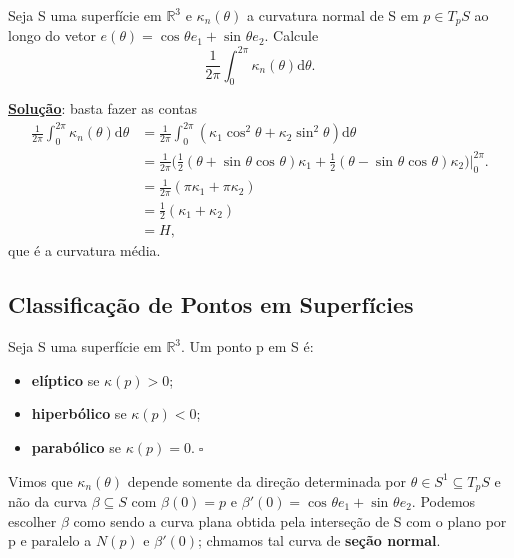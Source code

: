 \documentclass[../differential_geometry.tex]{subfiles}
\begin{document}
\begin{exr}
	Seja S uma superfície em \(\mathbb{R}^{3}\) e \(\kappa_{n}(\theta )\) a curvatura normal de S em \(p\in T_pS\) ao longo do vetor \(e(\theta ) = \cos^{}{\theta }e_1+\sin^{}{\theta }e_2\). Calcule
	\[
		\frac{1}{2\pi }\int_{0}^{2\pi }\kappa_{n}(\theta ) \mathrm{d}\theta .
	\]

	\textbf{\underline{Solução}}: basta fazer as contas
	\begin{align*}
		\frac{1}{2\pi }\int_{0}^{2\pi }\kappa_{n}(\theta ) \mathrm{d}\theta & =\frac{1}{2\pi }\int_{0}^{2\pi }(\kappa_1\cos^{2}{\theta } + \kappa_2\sin^{2}{\theta }) \mathrm{d}\theta                                                                              \\
		                                                                    & =\frac{1}{2\pi }\biggl(\frac{1}{2}(\theta +\sin^{}{\theta }\cos^{}{\theta })\kappa_1 + \frac{1}{2}(\theta -\sin^{}{\theta }\cos^{}{\theta })\kappa_2\biggr)\biggl|_{0}^{2\pi }\biggr. \\
		                                                                    & =\frac{1}{2\pi }(\pi \kappa_1 + \pi \kappa_2)                                                                                                                                         \\
		                                                                    & =\frac{1}{2}(\kappa_1+\kappa_2)                                                                                                                                                       \\
		                                                                    & = H,
	\end{align*}
	que é a curvatura média.
\end{exr}
\subsection{Classificação de Pontos em Superfícies}
\begin{def*}
	Seja S uma superfície em \(\mathbb{R}^{3}\). Um ponto p em S é:
	\begin{itemize}
		\item \textbf{elíptico} se \(\kappa (p) > 0\);
		\item \textbf{hiperbólico} se \(\kappa(p) < 0\);
		\item \textbf{parabólico} se \(\kappa(p) = 0.\; \square\)
	\end{itemize}
\end{def*}
Vimos que \(\kappa_{n}(\theta )\) depende somente da direção determinada por \(\theta \in S^{1}\subseteq T_{p}S\) e não da curva \(\beta \subseteq S\) com \(\beta(0) = p\) e \(\beta '(0) = \cos^{}{\theta }e_1 + \sin^{}{\theta }e_2\).
Podemos escolher \(\beta \) como sendo a curva plana obtida pela interseção de S com o plano por p e paralelo a \(N(p)\) e \(\beta '(0)\); chmamos tal curva de \textbf{seção normal}.
\end{document}
